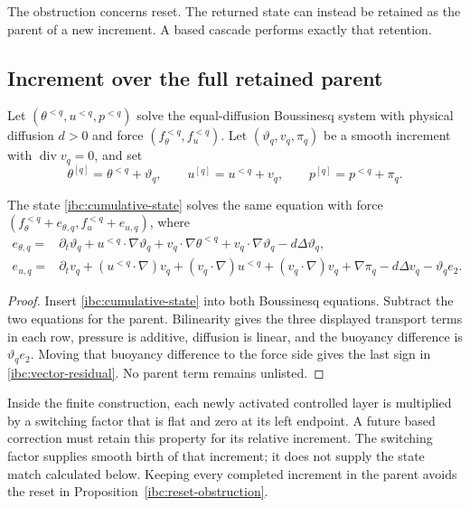 The obstruction concerns reset.  The returned state can instead be retained
as the parent of a new increment.  A based cascade performs exactly that
retention.

\subsection{Increment over the full retained parent}

Let $(\theta^{<q},u^{<q},p^{<q})$ solve the equal-diffusion Boussinesq
system with physical diffusion $d>0$ and force
$(f_\theta^{<q},f_u^{<q})$.  Let
$(\vartheta_q,v_q,\pi_q)$ be a smooth increment with
$\operatorname{div}v_q=0$, and set
\begin{equation}\label{ibc:cumulative-state}
 \theta^{[q]}=\theta^{<q}+\vartheta_q,\qquad
 u^{[q]}=u^{<q}+v_q,\qquad
 p^{[q]}=p^{<q}+\pi_q.
\end{equation}

\begin{proposition}\label{ibc:physical-residual}
The state \eqref{ibc:cumulative-state} solves the same equation with force
$(f_\theta^{<q}+e_{\theta,q},f_u^{<q}+e_{u,q})$, where
\begin{align}
 e_{\theta,q}={}&\partial_t\vartheta_q
  +u^{<q}\!\cdot\nabla\vartheta_q
  +v_q\!\cdot\nabla\theta^{<q}
  +v_q\!\cdot\nabla\vartheta_q-d\Delta\vartheta_q,
 \label{ibc:scalar-residual}\\
 e_{u,q}={}&\partial_tv_q+(u^{<q}\!\cdot\nabla)v_q
 +(v_q\!\cdot\nabla)u^{<q}+(v_q\!\cdot\nabla)v_q
 +\nabla\pi_q-d\Delta v_q-\vartheta_qe_2.
 \label{ibc:vector-residual}
\end{align}
\end{proposition}

\begin{proof}
Insert \eqref{ibc:cumulative-state} into both Boussinesq equations.
Subtract the two equations for the parent.  Bilinearity gives the three
displayed transport terms in each row, pressure is additive, diffusion is
linear, and the buoyancy difference is $\vartheta_qe_2$.  Moving that
buoyancy difference to the force side gives the last sign in
\eqref{ibc:vector-residual}.  No parent term remains unlisted.
\end{proof}

Inside the finite construction, each newly activated controlled layer is
multiplied by a switching factor that is flat and zero at its left endpoint.
A future based correction must retain this property for its relative
increment.  The switching factor supplies smooth birth of that increment; it
does not supply the state match calculated below.  Keeping every completed
increment in the parent avoids the reset in
Proposition~\ref{ibc:reset-obstruction}.


